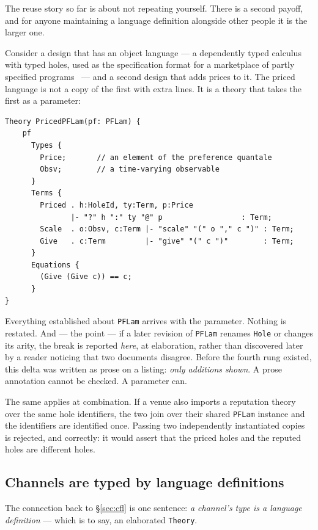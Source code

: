 The reuse story so far is about not repeating yourself. There is a second
payoff, and for anyone maintaining a language definition alongside other people
it is the larger one.

Consider a design that has an object language --- a dependently typed calculus
with typed holes, used as the specification format for a marketplace of partly
specified programs~\cite{PF} --- and a second design that adds prices to it. The
priced language is not a copy of the first with extra lines. It is a theory that
takes the first as a parameter:

\begin{lstlisting}[language=mettail]
Theory PricedPFLam(pf: PFLam) {
    pf
      Types {
        Price;       // an element of the preference quantale
        Obsv;        // a time-varying observable
      }
      Terms {
        Priced . h:HoleId, ty:Term, p:Price
               |- "?" h ":" ty "@" p                  : Term;
        Scale  . o:Obsv, c:Term |- "scale" "(" o "," c ")" : Term;
        Give   . c:Term         |- "give" "(" c ")"        : Term;
      }
      Equations {
        (Give (Give c)) == c;
      }
}
\end{lstlisting}

Everything established about \texttt{PFLam} arrives with the parameter. Nothing
is restated. And --- the point --- if a later revision of \texttt{PFLam} renames
\texttt{Hole} or changes its arity, the break is reported \emph{here}, at
elaboration, rather than discovered later by a reader noticing that two
documents disagree. Before the fourth rung existed, this delta was written as
prose on a listing: \emph{only additions shown}. A prose annotation cannot be
checked. A parameter can.

The same applies at combination. If a venue also imports a reputation theory
over the same hole identifiers, the two join over their shared \texttt{PFLam}
instance and the identifiers are identified once. Passing two independently
instantiated copies is rejected, and correctly: it would assert that the priced
holes and the reputed holes are different holes.

\subsection{Channels are typed by language definitions}

The connection back to \S\ref{sec:cfl} is one sentence: \emph{a channel's type
is a language definition} --- which is to say, an elaborated \texttt{Theory}.

